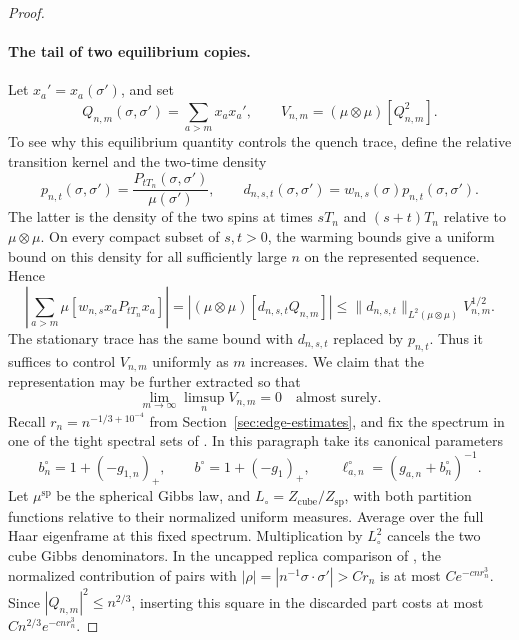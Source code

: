 \begin{proof}
\paragraph{The tail of two equilibrium copies.}
Let \(x_a'=x_a(\sigma')\), and set
\[
 Q_{n,m}(\sigma,\sigma')=\sum_{a>m}x_a x_a',\qquad
 V_{n,m}=(\mu\otimes\mu)[Q_{n,m}^2].
\]
To see why this equilibrium quantity controls the quench trace, define
the relative transition kernel and the two-time density
\[
 p_{n,t}(\sigma,\sigma')
   =\frac{P_{tT_n}(\sigma,\sigma')}{\mu(\sigma')},\qquad
 d_{n,s,t}(\sigma,\sigma')
   =w_{n,s}(\sigma)p_{n,t}(\sigma,\sigma').
\]
The latter is the density of the two spins at times \(sT_n\) and
\((s+t)T_n\) relative to \(\mu\otimes\mu\).  On every compact subset
of \(s,t>0\), the warming bounds give a uniform bound on this density
for all sufficiently large \(n\) on the represented sequence.
Hence
\[
 \left|\sum_{a>m}\mu[w_{n,s}x_aP_{tT_n}x_a]\right|
 =\left|(\mu\otimes\mu)[d_{n,s,t}Q_{n,m}]\right|
 \le\|d_{n,s,t}\|_{L^2(\mu\otimes\mu)}V_{n,m}^{1/2}.
\]
The stationary trace has the same bound with \(d_{n,s,t}\) replaced
by \(p_{n,t}\).  Thus it suffices to control \(V_{n,m}\) uniformly
as \(m\) increases.
We claim that the representation may be further extracted so that
\begin{equation}
 \lim_{m\to\infty}\limsup_n V_{n,m}=0
 \quad\text{almost surely}.
 \label{glim:static-tail}
\end{equation}
Recall \(r_n=n^{-1/3+10^{-4}}\) from
Section~\ref{sec:edge-estimates}, and fix the spectrum in one of the
tight spectral sets of \cite[Proposition~2.3]{FUA}.  In this paragraph
take its canonical parameters
\[
 b_n^\circ=1+(-g_{1,n})_+,\qquad
 b^\circ=1+(-g_1)_+,\qquad
 \ell_{a,n}^\circ=(g_{a,n}+b_n^\circ)^{-1}.
\]
Let \(\mu^{\mathrm{sp}}\) be the spherical Gibbs law, and
\(L_\circ=Z_{\mathrm{cube}}/Z_{\mathrm{sp}}\), with both partition
functions relative to their normalized uniform measures.  Average
over the full Haar eigenframe at this fixed spectrum.  Multiplication
by \(L_\circ^2\) cancels the two cube Gibbs denominators.  In the
uncapped replica comparison of \cite[Lemma~3.2]{FUA}, the normalized
contribution of pairs with
\(|\rho|=|n^{-1}\sigma\cdot\sigma'|>C r_n\) is at most
\(C e^{-c n r_n^3}\).  Since \(|Q_{n,m}|^2\le n^{2/3}\), inserting
this square in the discarded part costs at most
\(C n^{2/3}e^{-c n r_n^3}\).


\end{proof}
